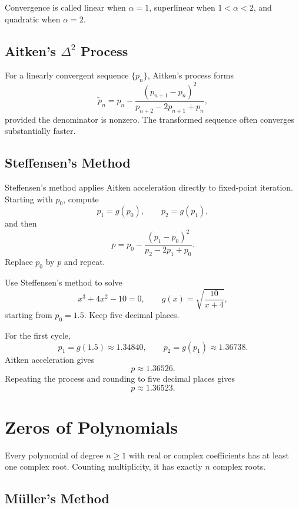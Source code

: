 Convergence is called linear when $\alpha=1$, superlinear when $1<\alpha<2$, and quadratic when $\alpha=2$.

\subsection{Aitken's $\Delta^2$ Process}

For a linearly convergent sequence $\{p_n\}$, Aitken's process forms
\[
 \widetilde p_n
 =p_n-\frac{(p_{n+1}-p_n)^2}
 {p_{n+2}-2p_{n+1}+p_n},
\]
provided the denominator is nonzero.  The transformed sequence often converges substantially faster.

\subsection{Steffensen's Method}

Steffensen's method applies Aitken acceleration directly to fixed-point iteration.  Starting with $p_0$, compute
\[
 p_1=g(p_0),
 \qquad
 p_2=g(p_1),
\]
and then
\[
 p=p_0-\frac{(p_1-p_0)^2}{p_2-2p_1+p_0}.
\]
Replace $p_0$ by $p$ and repeat.

\begin{example}
Use Steffensen's method to solve
\[
 x^3+4x^2-10=0,
 \qquad
 g(x)=\sqrt{\frac{10}{x+4}},
\]
starting from $p_0=1.5$.  Keep five decimal places.
\end{example}

\begin{solution}[4.6cm]
For the first cycle,
\[
 p_1=g(1.5)\approx1.34840,
 \qquad
 p_2=g(p_1)\approx1.36738.
\]
Aitken acceleration gives
\[
 p\approx1.36526.
\]
Repeating the process and rounding to five decimal places gives
\[
 p\approx1.36523.
\]
\end{solution}

\section{Zeros of Polynomials}

\begin{theorem}
Every polynomial of degree $n\ge1$ with real or complex coefficients has at least one complex root.  Counting multiplicity, it has exactly $n$ complex roots.
\end{theorem}

\subsection{Müller's Method}

